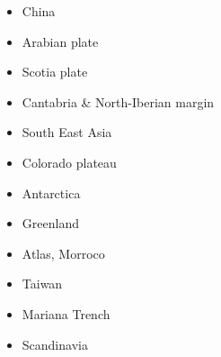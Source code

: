 \begin{itemize}
\item China 
{\scriptsize
\cite{zhst10}
\cite{wazh15}
\cite{guyr16}
\cite{dawl20}
}
\item Arabian plate 
{\scriptsize
\cite{rerl15}
}
\item Scotia plate 
{\scriptsize
\cite{necb13}
}
\item Cantabria \& North-Iberian margin 
{\scriptsize
\cite{clbb02}
\cite{peap15}
}
\item South East Asia 
{\scriptsize
\cite{rekv04}
\cite{yotr15}\cite{hasp15}\cite{meds15}
\cite{necg16}
}
\item Colorado plateau 
{\scriptsize
\cite{vabv10}
\cite{lesm11}
}
\item Antarctica  
{\scriptsize
\cite{huha07}
}
\item Greenland  
{\scriptsize
\cite{stsj15}\cite{heps15}\cite{stbl19}
}
\item Atlas, Morroco  
{\scriptsize
\cite{mica12}
\cite{kava14}
}
\item Taiwan  
{\scriptsize
\cite{chys01}\cite{liku16}
}
\item Mariana Trench  
{\scriptsize
\cite{zhlb15}
}
\item Scandinavia  
{\scriptsize
\cite{ramb80}
\cite{bovc14}
}



\end{itemize}






